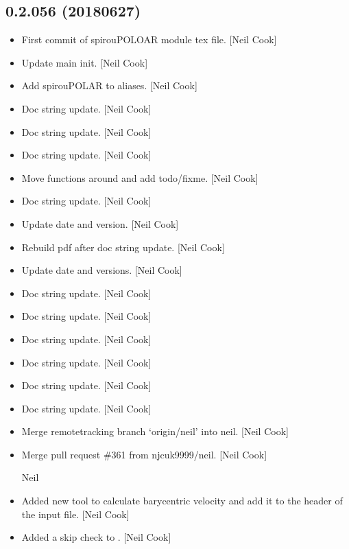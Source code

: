 \documentclass[a4paper,10pt,english]{report}
\begin{document}
\subsection{0.2.056 (2018\sphinxhyphen{}06\sphinxhyphen{}27)}
\label{\detokenize{misc/changelog:id427}}\begin{itemize}
\item {} 
First commit of spirouPOLOAR module tex file. {[}Neil Cook{]}

\item {} 
Update main init. {[}Neil Cook{]}

\item {} 
Add spirouPOLAR to aliases. {[}Neil Cook{]}

\item {} 
Doc string update. {[}Neil Cook{]}

\item {} 
Doc string update. {[}Neil Cook{]}

\item {} 
Doc string update. {[}Neil Cook{]}

\item {} 
Move functions around and add todo/fixme. {[}Neil Cook{]}

\item {} 
Doc string update. {[}Neil Cook{]}

\item {} 
Update date and version. {[}Neil Cook{]}

\item {} 
Rebuild pdf after doc string update. {[}Neil Cook{]}

\item {} 
Update date and versions. {[}Neil Cook{]}

\item {} 
Doc string update. {[}Neil Cook{]}

\item {} 
Doc string update. {[}Neil Cook{]}

\item {} 
Doc string update. {[}Neil Cook{]}

\item {} 
Doc string update. {[}Neil Cook{]}

\item {} 
Doc string update. {[}Neil Cook{]}

\item {} 
Doc string update. {[}Neil Cook{]}

\item {} 
Merge remote\sphinxhyphen{}tracking branch ‘origin/neil’ into neil. {[}Neil Cook{]}

\item {} 
Merge pull request \#361 from njcuk9999/neil. {[}Neil Cook{]}

Neil

\item {} 
Added new tool to calculate barycentric velocity and add it to the
header of the input file. {[}Neil Cook{]}

\item {} 
Added a skip check to . {[}Neil Cook{]}

\end{itemize}
\end{document}
